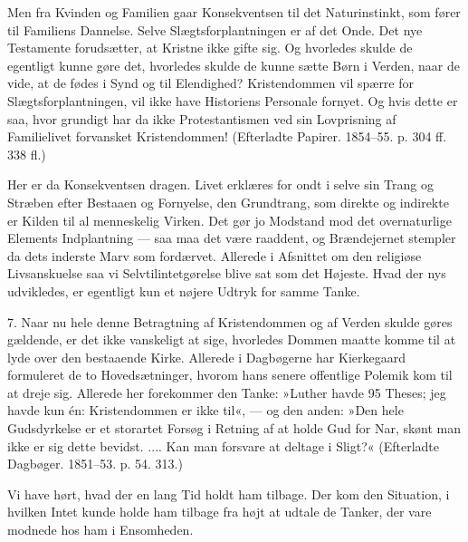\documentclass[12pt,a4paper,openany]{book}
\newcommand{\opage}[1]{\marginnote{\footnotesize\textit{[#1]}}}
\begin{document}
Men fra Kvinden og Familien gaar Konsekventsen
til det Naturinstinkt, som fører til Familiens Dannelse.
\opage{142}Selve Slægtsforplantningen er af det Onde. Det nye Testamente
forudsætter, at Kristne ikke gifte sig. Og hvorledes
skulde de egentligt kunne gøre det, hvorledes skulde
de kunne sætte Børn i Verden, naar de vide, at de fødes
i Synd og til Elendighed? Kristendommen vil spærre for
Slægtsforplantningen, vil ikke have Historiens Personale
fornyet. Og hvis dette er saa, hvor grundigt har da ikke
Protestantismen ved sin Lovprisning af Familielivet forvansket
Kristendommen! (Efterladte Papirer. 1854--55.
p. 304 ff. 338 fl.)

Her er da Konsekventsen dragen. Livet erklæres
for ondt i selve sin Trang og Stræben efter Bestaaen og
Fornyelse, den Grundtrang, som direkte og indirekte er
Kilden til al menneskelig Virken. Det gør jo Modstand
mod det overnaturlige Elements Indplantning --- saa maa
det være raaddent, og Brændejernet stempler da dets
inderste Marv som fordærvet. Allerede i Afsnittet om
den religiøse Livsanskuelse saa vi Selvtilintetgørelse blive
sat som det Højeste. Hvad der nys udvikledes, er egentligt
kun et nøjere Udtryk for samme Tanke.

7. Naar nu hele denne Betragtning af Kristendommen
og af Verden skulde gøres gældende, er det ikke
vanskeligt at sige, hvorledes Dommen maatte komme til
at lyde over den bestaaende Kirke. Allerede i Dagbøgerne
har Kierkegaard formuleret de to Hovedsætninger,
hvorom hans senere offentlige Polemik kom til at dreje
sig. Allerede her forekommer den Tanke: »Luther havde
95 Theses; jeg havde kun én: Kristendommen er ikke
til«, --- og den anden: »Den hele Gudsdyrkelse er et
storartet Forsøg i Retning af at holde Gud for Nar,
skønt man ikke er sig dette bevidst. .... Kan man forsvare
at deltage i Sligt?« (Efterladte Dagbøger. 1851--53.
p. 54. 313.)

\opage{143}Vi have hørt, hvad der en lang Tid holdt ham tilbage.
Der kom den Situation, i hvilken Intet kunde
holde ham tilbage fra højt at udtale de Tanker, der vare
modnede hos ham i Ensomheden.
\end{document}
